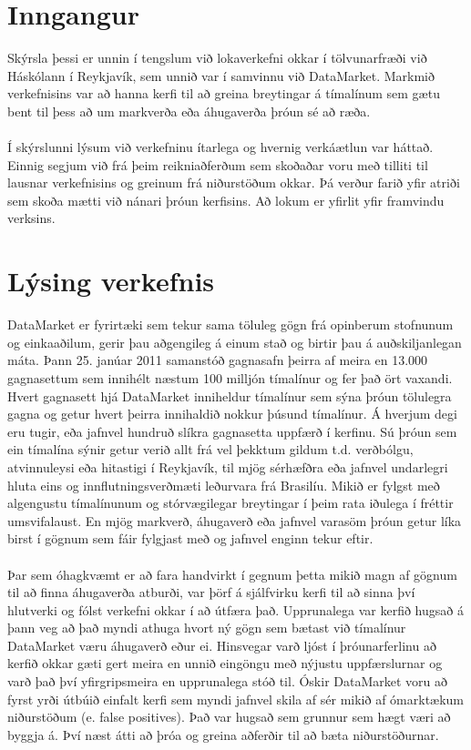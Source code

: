 \documentclass{article}
\begin{document}
\raggedright

\tableofcontents
\newpage

\section{Inngangur}
Skýrsla þessi er unnin í tengslum við lokaverkefni okkar í tölvunarfræði við Háskólann í Reykjavík,
sem unnið var í samvinnu við DataMarket. Markmið verkefnisins var að hanna kerfi til að greina
breytingar á tímalínum sem gætu bent til þess að um markverða eða áhugaverða þróun sé að ræða. 
\\ \hfill
\\
Í skýrslunni lýsum við verkefninu ítarlega og hvernig verkáætlun var háttað.
Einnig segjum við frá þeim reikniaðferðum sem skoðaðar voru með tilliti til 	
lausnar verkefnisins og greinum frá niðurstöðum okkar. Þá 
verður farið yfir atriði sem skoða mætti við nánari þróun kerfisins.
Að lokum er yfirlit yfir framvindu verksins.

\newpage
\section{Lýsing verkefnis}
\label{sec:description}
DataMarket er fyrirtæki sem tekur sama töluleg gögn frá opinberum
stofnunum og einkaaðilum, gerir þau aðgengileg á einum stað og birtir þau á
auðskiljanlegan máta. Þann 25. janúar 2011 samanstóð gagnasafn þeirra 
af meira en 13.000 gagnasettum sem innihélt næstum 100 milljón tímalínur og 
fer það ört vaxandi. Hvert gagnasett hjá DataMarket inniheldur tímalínur sem sýna þróun tölulegra
gagna og getur hvert þeirra innihaldið nokkur þúsund tímalínur. 
Á hverjum degi eru tugir, eða jafnvel hundruð slíkra gagnasetta uppfærð í
kerfinu. Sú þróun sem ein tímalína sýnir getur verið allt frá vel þekktum gildum t.d. verðbólgu, atvinnuleysi eða
hitastigi í Reykjavík, til mjög sérhæfðra eða jafnvel undarlegri hluta eins og 
innflutningsverðmæti leðurvara frá Brasilíu. 
Mikið er fylgst með algengustu tímalínunum og stórvægilegar breytingar 
í þeim rata iðulega í fréttir umsvifalaust. 
En mjög markverð, áhugaverð eða jafnvel varasöm þróun getur líka birst 
í gögnum sem fáir fylgjast með og jafnvel enginn tekur eftir. 
\\ \hfill
\\
Þar sem óhagkvæmt er að fara handvirkt í gegnum þetta mikið magn af gögnum 
til að finna áhugaverða atburði, var þörf á sjálfvirku kerfi til að 
sinna því hlutverki og fólst verkefni okkar í að útfæra það.
Upprunalega var kerfið hugsað á þann veg að það myndi athuga hvort ný gögn sem
bætast við tímalínur DataMarket væru áhugaverð eður ei. Hinsvegar
varð ljóst í þróunarferlinu að kerfið okkar gæti gert meira en unnið
eingöngu með nýjustu uppfærslurnar og varð það því yfirgripsmeira en
upprunalega stóð til.
Óskir DataMarket voru að fyrst yrði útbúið einfalt kerfi sem myndi jafnvel 
skila af sér mikið af ómarktækum niðurstöðum (e. false positives). Það var hugsað
sem grunnur sem hægt væri að byggja á. Því næst átti að þróa og greina aðferðir til
að bæta niðurstöðurnar. 
\end{document}
